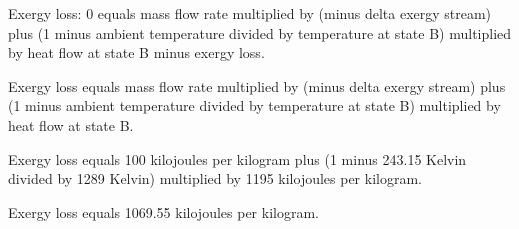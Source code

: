 Exergy loss:  
0 equals mass flow rate multiplied by (minus delta exergy stream) plus (1 minus ambient temperature divided by temperature at state B) multiplied by heat flow at state B minus exergy loss.  

Exergy loss equals mass flow rate multiplied by (minus delta exergy stream) plus (1 minus ambient temperature divided by temperature at state B) multiplied by heat flow at state B.  

Exergy loss equals 100 kilojoules per kilogram plus (1 minus 243.15 Kelvin divided by 1289 Kelvin) multiplied by 1195 kilojoules per kilogram.  

Exergy loss equals 1069.55 kilojoules per kilogram.